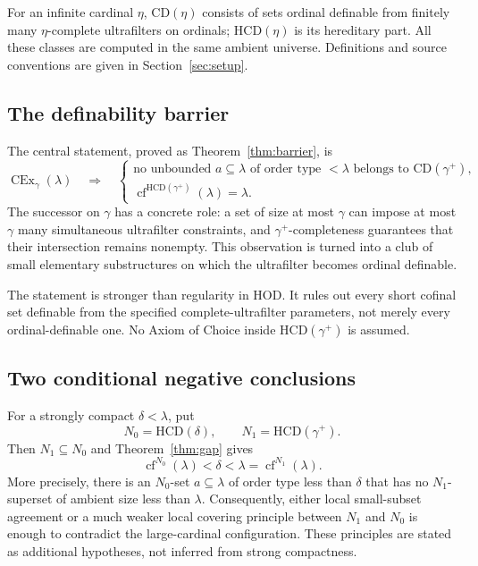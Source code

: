 \documentclass[11pt,letterpaper]{article}
\theoremstyle{definition}
\newcommand{\CEx}{\operatorname{CEx}}
\newcommand{\cf}{\operatorname{cf}}
\newcommand{\CD}{\mathrm{CD}}
\newcommand{\HCD}{\mathrm{HCD}}
\begin{document}
For an infinite cardinal $\eta$, $\CD(\eta)$ consists of sets ordinal definable
from finitely many $\eta$-complete ultrafilters on ordinals; $\HCD(\eta)$ is its
hereditary part. All these classes are computed in the same ambient universe.
Definitions and source conventions are given in Section~\ref{sec:setup}.

\subsection{The definability barrier}

The central statement, proved as Theorem~\ref{thm:barrier}, is
\begin{equation}\label{eq:mainbarrier}
 \CEx_\gamma(\lambda)\quad\Longrightarrow\quad
 \begin{cases}
 \text{no unbounded }a\subseteq\lambda\text{ of order type }<\lambda
     \text{ belongs to }\CD(\gamma^+),\\
 \cf^{\HCD(\gamma^+)}(\lambda)=\lambda.
 \end{cases}
\end{equation}
The successor on $\gamma$ has a concrete role: a set of size at most $\gamma$
can impose at most $\gamma$ many simultaneous ultrafilter constraints, and
$\gamma^+$-completeness guarantees that their intersection remains nonempty.
This observation is turned into a club of small elementary substructures on
which the ultrafilter becomes ordinal definable.

The statement is stronger than regularity in HOD. It rules out every short
cofinal set definable from the specified complete-ultrafilter parameters,
not merely every ordinal-definable one. No Axiom of Choice inside
$\HCD(\gamma^+)$ is assumed.

\subsection{Two conditional negative conclusions}

For a strongly compact $\delta<\lambda$, put
\[
 N_0=\HCD(\delta),\qquad N_1=\HCD(\gamma^+).
\]
Then $N_1\subseteq N_0$ and Theorem~\ref{thm:gap} gives
\begin{equation}\label{eq:cofgap}
 \cf^{N_0}(\lambda)<\delta<\lambda=\cf^{N_1}(\lambda).
\end{equation}
More precisely, there is an $N_0$-set $a\subseteq\lambda$ of order type less than
$\delta$ that has no $N_1$-superset of ambient size less than $\lambda$.
Consequently, either local small-subset agreement or a much weaker local
covering principle between $N_1$ and $N_0$ is enough to contradict the
large-cardinal configuration. These principles are stated as additional
hypotheses, not inferred from strong compactness.
\end{document}
